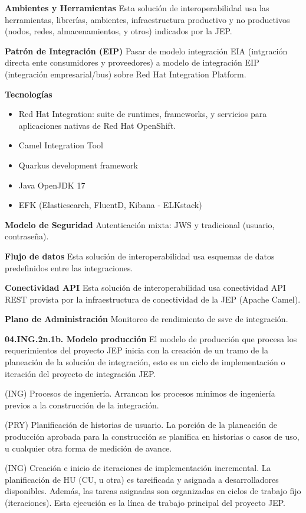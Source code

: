 \documentclass[
  paper=a4,
  ,captions=tableheading
]{scrartcl}
\providecommand{\tightlist}{%
  \setlength{\itemsep}{0pt}\setlength{\parskip}{0pt}}
\begin{document}
\textbf{Ambientes y Herramientas} Esta solución de interoperabilidad usa
las herramientas, librerías, ambientes, infraestructura productivo y no
productivos (nodos, redes, almacenamientos, y otros) indicados por la
JEP.

\textbf{Patrón de Integración (EIP)} Pasar de modelo integración EIA
(intgración directa ente consumidores y proveedores) a modelo de
integración EIP (integración empresarial/bus) sobre Red Hat Integration
Platform.

\textbf{Tecnologías}

\begin{itemize}
\tightlist
\item
  Red Hat Integration: suite de runtimes, frameworks, y servicios para
  aplicaciones nativas de Red Hat OpenShift.
\item
  Camel Integration Tool
\item
  Quarkus development framework
\item
  Java OpenJDK 17
\item
  EFK (Elasticsearch, FluentD, Kibana - ELKstack)
\end{itemize}

\textbf{Modelo de Seguridad} Autenticación mixta: JWS y tradicional
(usuario, contraseña).

\textbf{Flujo de datos} Esta solución de interoperabilidad usa esquemas
de datos predefinidos entre las integraciones.

\textbf{Conectividad API} Esta solución de interoperabilidad usa
conectividad API REST provista por la infraestructura de conectividad de
la JEP (Apache Camel).

\textbf{Plano de Administración} Monitoreo de rendimiento de ssvc de
integración.

\textbf{04.ING.2n.1b. Modelo producción} El modelo de producción que
procesa los requerimientos del proyecto JEP inicia con la creación de un
tramo de la planeación de la solución de integración, esto es un ciclo
de implementación o iteración del proyecto de integración JEP.

(ING) Procesos de ingeniería. Arrancan los procesos mínimos de
ingeniería previos a la construcción de la integración.

(PRY) Planificación de historias de usuario. La porción de la planeación
de producción aprobada para la construcción se planifica en historias o
casos de uso, u cualquier otra forma de medición de avance.

(ING) Creación e inicio de iteraciones de implementación incremental. La
planificación de HU (CU, u otra) es tareificada y asignada a
desarrolladores disponibles. Además, las tareas asignadas son
organizadas en ciclos de trabajo fijo (iteraciones). Esta ejecución es
la línea de trabajo principal del proyecto JEP.
\end{document}
